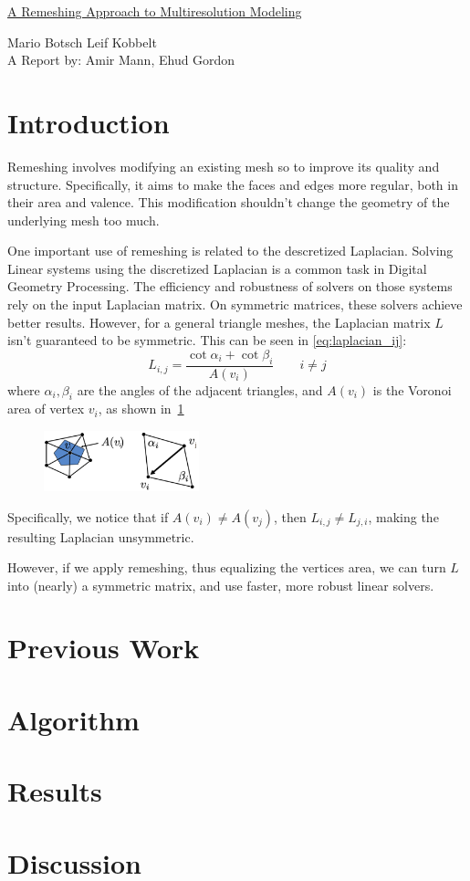 \documentclass{article}
\begin{document}
\begin{center}
  {\huge \underline{A Remeshing Approach to Multiresolution Modeling}} \\ \vspace{1em}
  
  {\Large {Mario Botsch \quad Leif Kobbelt}} \\ \vspace{1em}
  {A Report by: Amir Mann, Ehud Gordon}
\end{center}
\section{Introduction}
Remeshing involves modifying an existing mesh so to improve its quality and structure. Specifically, it aims to make the faces and edges more regular, both in their area and valence. This modification shouldn't change the geometry of the underlying mesh too much.

One important use of remeshing is related to the descretized Laplacian. Solving Linear systems using the discretized Laplacian is a common task in Digital Geometry Processing. The efficiency and robustness of solvers on those systems rely on the input Laplacian matrix. On symmetric matrices, these solvers achieve better results. However, for a general triangle meshes, the Laplacian matrix $L$ isn't guaranteed to be symmetric. This can be seen in \cref{eq:laplacian_ij}:
\begin{equation} \label{eq:laplacian_ij}
  L_{i,j} =  \frac{\cot \alpha_{i} + \cot \beta_{i}} {A(v_i)} \quad \quad i \neq j  
\end{equation}
where $\alpha_{i}, \beta_{i}$ are the angles of the adjacent triangles, and $A(v_i)$ is the Voronoi area of vertex $v_i$, as shown in~\cref{fig:laplaceCot2} 
\begin{figure}[H] \centering \includegraphics[height=0.3\textheight,width=0.4\textwidth,keepaspectratio]{laplaceCot2} \caption{} \label{fig:laplaceCot2} \end{figure}
Specifically, we notice that if  $A(v_i) \neq A(v_j)$, then $L_{i,j} \neq L_{j,i}$, making the resulting Laplacian unsymmetric. 

However, if we apply remeshing, thus equalizing the vertices area, we can turn $L$ into (nearly) a symmetric matrix, and use faster, more robust linear solvers.
\section{Previous Work}

\section{Algorithm}

\section{Results}

\section{Discussion}
\end{document}
